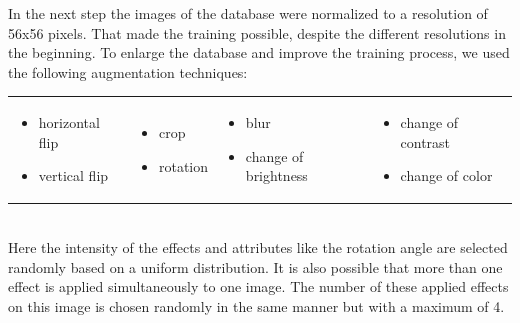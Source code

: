 \documentclass{tubaf-article}
\begin{document}
	In the next step the images of the database were normalized to a resolution of 56x56 pixels. That made the training possible, despite the different resolutions in the beginning. To enlarge the database and improve the training process, we used the following augmentation techniques: \\
	\begin{tabular}{>{\raggedright\arraybackslash}p{3cm}>{\raggedright\arraybackslash}p{2.5cm}>{\raggedright\arraybackslash}p{4cm}>{\raggedright\arraybackslash}p{3.5cm}}
		\begin{itemize}[left=0pt] 
			\item horizontal flip
			\item vertical flip
		\end{itemize} &
		\begin{itemize}[left=0pt]
			\item crop
			\item rotation
		\end{itemize} &
		\begin{itemize}[left=0pt]
			\item blur
			\item change of brightness
		\end{itemize} &
		\begin{itemize}[left=0pt]
			\item change of contrast
			\item change of color
		\end{itemize} 
	\end{tabular} \\
	Here the intensity of the effects and attributes like the rotation angle are selected randomly based on a uniform distribution. It is also possible that more than one effect is applied simultaneously to one image. The number of these applied effects on this image is chosen randomly in the same manner but with a maximum of 4.
\end{document}
